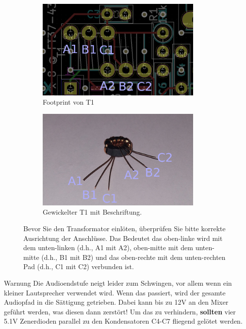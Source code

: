 \documentclass[10pt, a4paper,twoside]{scrartcl}
\newenvironment{warning}{\begin{bclogo}[couleur=red!30,arrondi=.1,logo=\bcattention,ombre=true]{Warnung}}{\end{bclogo}}
\begin{document}
\begin{figure}[ht!]
 \begin{subfigure}[t]{0.49\textwidth}
   \centering
   \includegraphics[width=0.9\textwidth]{fig/RX_T1.png}
   \caption{Footprint von T1}
 \end{subfigure}
 \begin{subfigure}[t]{0.49\textwidth}
   \centering
   \includegraphics[width=0.9\textwidth]{fig/RX_T1_IMG_small.png}
   \caption{Gewickelter T1 mit Beschriftung.}
 \end{subfigure}
 \caption{Bevor Sie den Transformator einlöten, überprüfen Sie bitte korrekte Ausrichtung der Anschlüsse. Das Bedeutet das oben-linke wird mit dem unten-linken (d.h., A1 mit A2), oben-mitte mit dem unten-mitte (d.h., B1 mit B2) und das oben-rechte mit dem unten-rechten Pad (d.h., C1 mit C2) verbunden ist.}
\end{figure}

\begin{warning}
Die Audioendstufe neigt leider zum Schwingen, vor allem wenn ein kleiner Lautsprecher verwendet wird. Wenn das passiert, wird der gesamte Audiopfad in die Sättigung getrieben. Dabei kann bis zu 12V an den Mixer geführt werden, was diesen dann zerstört! Um das zu verhindern, \textbf{sollten} vier 5.1V Zenerdioden parallel zu den Kondensatoren C4-C7 fliegend gelötet werden. 
\end{warning}
\end{document}
